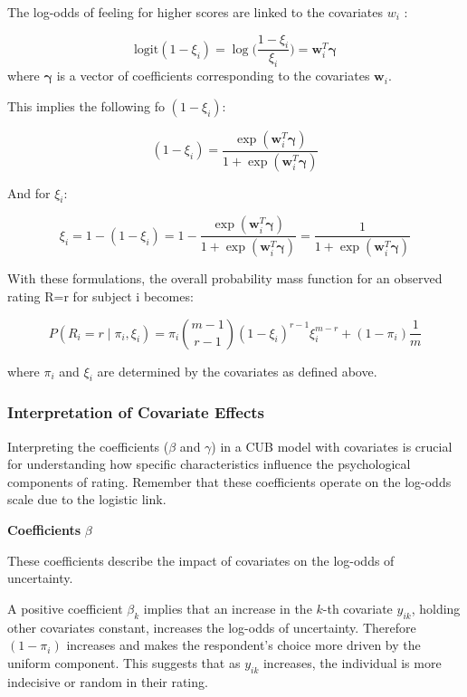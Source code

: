 \documentclass[
  letterpaper,
  DIV=11,
  numbers=noendperiod]{scrartcl}
\begin{document}
The log-odds of feeling for higher scores are linked to the covariates
\(w_i\) :

\[
\text{logit}(1-\xi_i) = \log \Bigg(\frac{1-\xi_i}{\xi_i}\Bigg) = \boldsymbol{w}^{T}_i\boldsymbol{\gamma}
\] where \(\boldsymbol{\gamma}\) is a vector of coefficients
corresponding to the covariates \(\boldsymbol{w}_i\).

This implies the following fo \((1−\xi_i)\):

\[
(1-\xi_i)=\frac{\exp(\boldsymbol{w}^{T}_i\boldsymbol{\gamma})}{1+\exp(\boldsymbol{w}^{T}_i\boldsymbol{\gamma})}
\]

And for \(\xi_i\):

\[
\xi_i = 1-(1-\xi_i) = 1- \frac{\exp(\boldsymbol{w}^{T}_i\boldsymbol{\gamma})}{1+\exp(\boldsymbol{w}^{T}_i\boldsymbol{\gamma})} = \frac{1}{1+\exp(\boldsymbol{w}^{T}_i\boldsymbol{\gamma})}
\]

With these formulations, the overall probability mass function for an
observed rating R=r for subject i becomes:

\[
P(R_i = r \mid \pi_i,\xi_i) = \pi_i \binom{m-1}{r-1}(1-\xi_i)^{r-1}\xi_i^{m-r} + (1-\pi_i) \frac{1}{m}
\]

where \(\pi_i\) and \(\xi_i\) are determined by the covariates as
defined above.

\hypertarget{interpretation-of-covariate-effects}{%
\subsubsection{Interpretation of Covariate
Effects}\label{interpretation-of-covariate-effects}}

Interpreting the coefficients (\(\beta\) and \(\gamma\)) in a CUB model
with covariates is crucial for understanding how specific
characteristics influence the psychological components of rating.
Remember that these coefficients operate on the log-odds scale due to
the logistic link.

\textbf{Coefficients} \(\beta\)

These coefficients describe the impact of covariates on the log-odds of
uncertainty.

A positive coefficient \(\beta_k\) implies that an increase in the
\(k\)-th covariate \(y_{ik}\), holding other covariates constant,
increases the log-odds of uncertainty. Therefore \((1−\pi_i)\) increases
and makes the respondent's choice more driven by the uniform component.
This suggests that as \(y_{ik}\) increases, the individual is more
indecisive or random in their rating.
\end{document}
